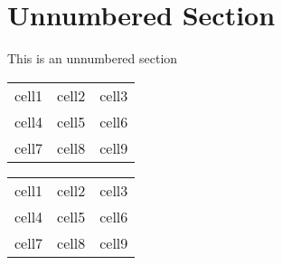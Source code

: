 \documentclass[12pt, a4paper]{report}  %
\begin{document}
\section*{Unnumbered Section}
This is an unnumbered section


\begin{center}
\begin{tabular}{ c c c }  %
 cell1 & cell2 & cell3 \\ 
 cell4 & cell5 & cell6 \\  
 cell7 & cell8 & cell9    
\end{tabular}
\end{center}  %

\begin{center}
\begin{tabular}{ |c|c|c| }  %
 \hline  %
 cell1 & cell2 & cell3 \\ 
 cell4 & cell5 & cell6 \\ 
 cell7 & cell8 & cell9 \\ 
 \hline  %
\end{tabular}
\end{center}
\end{document}
